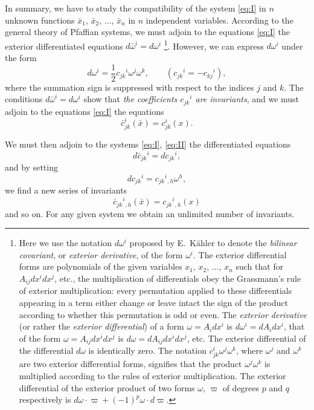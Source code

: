 \documentclass[leqno,11pt]{article}
\theoremstyle{shape1}
\theoremstyle{shape0}
\theoremstyle{shape2}
\theoremstyle{definition}
\begin{document}
In summary, we have to study the compatibility of the system \eqref{eq:I} in $n$ unknown functions $\bar x_{1}$, $\bar x_{2}$, $\dots$, $\bar x_{n}$ in $n$ independent variables. According to the general theory of Pfaffian systems, we must adjoin to the equations \eqref{eq:I} the exterior differentiated equations $d\bar\omega^{i}=d\omega^{i}$ \footnote{Here we use the notation $d\omega^{i}$ proposed by E.~Kähler to denote the \emph{bilinear covariant}, or \emph{exterior derivative}, of the form $\omega^{i}$. The exterior differential forms are polynomials of the given variables $x_{1}$, $x_{2}$, $\dots$, $x_{n}$ such that for $A_{ij}dx^{i}dx^{j}$, etc., the multiplication of differentials obey the Grassmann's rule of exterior multiplication: every permutation applied to these differentials appearing in a term either change or leave intact the sign of the product according to whether this permutation is odd or even. The \emph{exterior derivative} (or rather the \emph{exterior differential}) of a form $\omega=A_{i}dx^{i}$ is $d\omega^{i}=dA_{i}dx^{i}$, that of the form $\omega=A_{ij}dx^{i}dx^{j}$ is $d\omega=dA_{ij}dx^{i}dx^{j}$, etc. The exterior differential of the differential $d\omega$ is identically zero. The notation $c_{jk}^{i}\omega^{j}\omega^{k}$, where $\omega^{j}$ and $\omega^{k}$ are two exterior differential forms, signifies that the product $\omega^{j}\omega^{k}$ is multiplied according to the rules of exterior multiplication. The exterior differential of the exterior product of two forms $\omega$, $\varpi$ of degrees $p$ and $q$ respectively is $d\omega\cdot\varpi+(-1)^{p}\omega\cdot d\varpi$.}. However, we can express $d\omega^{i}$ under the form
\[
d\omega^{i}=\frac{1}{2}c_{jk}{}^{i}\omega^{j}\omega^{k},\qquad(c_{jk}{}^{i}=-c_{kj}{}^{i}),
\]
where the summation sign is suppressed with respect to the indices $j$ and $k$. The conditions $d\bar\omega^{i}=d\omega^{i}$ show that \emph{the coefficients $c_{jk}{}^{i}$ are invariants}, and we must adjoin to the equations \eqref{eq:I} the equations
\begin{equation}
  \label{eq:II}\tag{II}
  \bar c_{jk}^{i}(\bar x)=c_{jk}^{i}(x).
\end{equation}

We must then adjoin to the systems \eqref{eq:I}, \eqref{eq:II} the differentiated equations
\[
d\bar c_{jk}{}^{i}=dc_{jk}{}^{i},
\]
and by setting
\[
dc_{jk}{}^{i}=c_{jk}{}^{i}{}_{,h}\omega^{h},
\]
we find a new series of invariants
\begin{equation}
  \label{eq:III}\tag{III}
  \bar c_{jk}{}^{i}{}_{,h}(\bar x)=c_{jk}{}^{i}{}_{,h}(x)
\end{equation}
and so on. For any given system we obtain an unlimited number of invariants.
\end{document}
